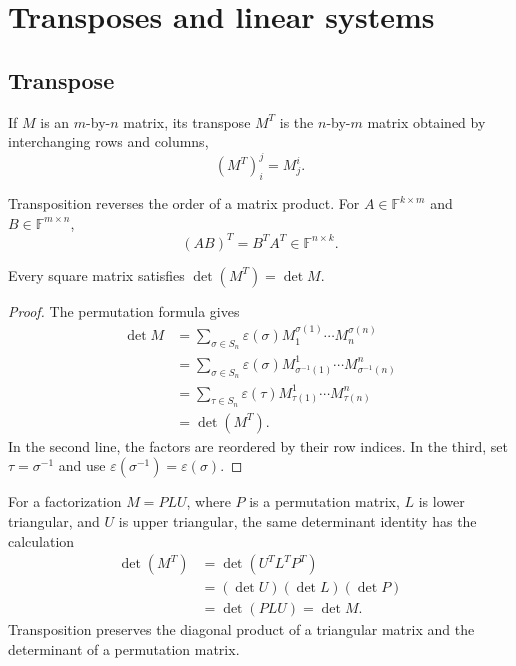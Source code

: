 \section{Transposes and linear systems}
\label{sec:linear-algebra-i:transposes-and-linear-systems}

\subsection{Transpose}

\begin{definition}
  If \(M\) is an \(m\)-by-\(n\) matrix, its transpose \(M^T\)
  is the \(n\)-by-\(m\) matrix obtained by interchanging rows and columns,
  \[
    (M^T)^j_i=M^i_j.
  \]
\end{definition}

Transposition reverses the order of a matrix product. For
\(A\in\mathbb F^{k\times m}\) and \(B\in\mathbb F^{m\times n}\),
\[
  (AB)^T=B^TA^T\in\mathbb F^{n\times k}.
\]

\begin{theorem}
  \label{thm:linear-algebra-i:determinant-transpose}
  Every square matrix satisfies \(\det(M^T)=\det M\).
\end{theorem}

\begin{proof}
  The permutation formula gives
  \begin{align*}
    \det M
      &=\sum_{\sigma\in S_n}\varepsilon(\sigma)
        M^{\sigma(1)}_1\cdots M^{\sigma(n)}_n\\
      &=\sum_{\sigma\in S_n}\varepsilon(\sigma)
        M^1_{\sigma^{-1}(1)}\cdots M^n_{\sigma^{-1}(n)}\\
      &=\sum_{\tau\in S_n}\varepsilon(\tau)
        M^1_{\tau(1)}\cdots M^n_{\tau(n)}\\
      &=\det(M^T).
  \end{align*}
  In the second line, the factors are reordered by their row indices.
  In the third, set \(\tau=\sigma^{-1}\) and use
  \(\varepsilon(\sigma^{-1})=\varepsilon(\sigma)\).
\end{proof}

\begin{remark}
  For a factorization \(M=PLU\), where \(P\) is a permutation matrix,
  \(L\) is lower triangular, and \(U\) is upper triangular, the same
  determinant identity has the calculation
  \begin{align*}
    \det(M^T)&=\det(U^TL^TP^T)\\
      &=(\det U)(\det L)(\det P)\\
      &=\det(PLU)=\det M.
  \end{align*}
  Transposition preserves the diagonal product of a triangular matrix
  and the determinant of a permutation matrix.
\end{remark}


